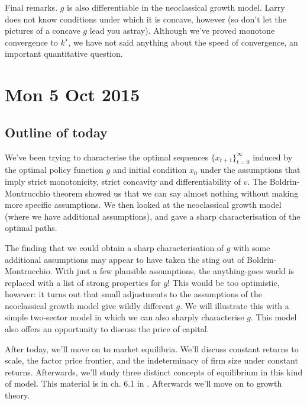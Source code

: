 \documentclass[11pt,letterpaper,reqno,oneside]{article}
\begin{document}
Final remarks. $g$ is also differentiable in the neoclassical growth model. Larry does not know conditions under which it is concave, however (so don't let the pictures of a concave $g$ lead you astray). Although we've proved monotone convergence to $k^\star$, we have not said anything about the speed of convergence, an important quantitative question.



\pagebreak
\section{Mon 5 Oct 2015}
\label{sec:05Oct2015}


\subsection{Outline of today}
\label{sec:05Oct2015:outline_of_today}

We've been trying to characterise the optimal sequences $\{ x_{t+1} \}_{t=0}^\infty$ induced by the optimal policy function $g$ and initial condition $x_0$ under the assumptions that imply strict monotonicity, strict concavity and differentiability of $v$. The Boldrin-Montrucchio theorem showed us that we can say almost nothing without making more specific assumptions. We then looked at the neoclassical growth model (where we have additional assumptions), and gave a sharp characterisation of the optimal paths.

The finding that we could obtain a sharp characterisation of $g$ with some additional assumptions may appear to have taken the sting out of Boldrin-Montrucchio. With just a few plausible assumptions, the anything-goes world is replaced with a list of strong properties for $g$! This would be too optimistic, however: it turns out that small adjustments to the assumptions of the neoclassical growth model give wildly different $g$. We will illustrate this with a simple two-sector model in which we can also sharply characterise $g$. This model also offers an opportunity to discuss the price of capital.

After today, we'll move on to market equilibria. We'll discuss constant returns to scale, the factor price frontier, and the indeterminacy of firm size under constant returns. Afterwards, we'll study three distinct concepts of equilibrium in this kind of model. This material is in ch. 6.1 in \textcite{StokeyLucasPrescott1989}. Afterwards we'll move on to growth theory.
\end{document}

